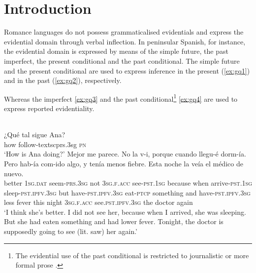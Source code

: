 \documentclass[output=paper]{langsci/langscibook}
\author{Geraldine Quartararo \affiliation{Department of Romance Studies and Classics, Stockholm University}}
\begin{document}
\maketitle

\section{Introduction} 
Romance languages do not possess grammaticalised evidentials and express the evidential domain through verbal inflection. In peninsular Spanish, for instance, the evidential domain is expressed by means of the simple future, the past imperfect, the present conditional and the past conditional. The simple future and the present conditional are used to express inference in the present (\ref{ex:gq1}) and in the past (\ref{ex:gq2}), respectively. 



Whereas the imperfect \ref{ex:gq3} and the past conditional\footnote{The evidential use of the past conditional is restricted to journalistic or more formal prose \citep[33]{Reyes1996}.}  \ref{ex:gq4} are used to express reported evidentiality. 


\ea \label{ex:gq3}
\\
	\ea \label{ex:gq3a}
		\gll ¿{Qué tal} sigue Ana?\\
		how follow-textsc{prs.3sg} \textsc{pn}\\
		\glt ‘How is Ana doing?’
	\ex \label{ex:gq3b}
	\gll Mejor me parece. No la v-i, porque cuando llegu-é dorm-ía. Pero hab-ía com-ido  algo, y tenía menos fiebre. Esta noche la veía el médico de nuevo.\\
    better \textsc{1sg.dat} seem-\textsc{prs.3sg} not \textsc{3sg.f.acc} see-\textsc{pst.1sg} because when arrive-\textsc{pst.1sg} sleep-\textsc{pst.ipfv.3sg} but have-\textsc{pst.ipfv.3sg} eat-\textsc{ptcp} something and have-\textsc{pst.ipfv.3sg} less fever this night \textsc{3sg.f.acc} see.\textsc{pst.ipfv.3sg} the  doctor again\\
	\glt ‘I think she’s better. I did not see her, because when I arrived, she was sleeping. But she had eaten something and had lower fever. Tonight, the doctor is supposedly going to see (lit. saw) her again.’
	\z
\z
\end{document}
